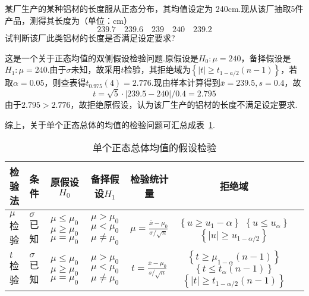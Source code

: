 \begin{example}\label{exam7.2.2}
	某厂生产的某种铝材的长度服从正态分布，其均值设定为 240cm.现从该厂抽取5件产品，测得其长度为（单位：cm）
	\[239.7 \quad 239.6 \quad 239 \quad 240 \quad 239.2\]
	试判断该厂此类铝材的长度是否满足设定要求?
	
	这是一个关于正态均值的双侧假设检验问题.原假设是$H_{0}:\mu =240$，备择假设是$H_{1}:\mu =240$.由于$\sigma$未知，故采用$t$检验，其拒绝域为$\left\{\left| t\right|\geq t_{1-a/2}\left(n-1\right)\right\}$，若取$\alpha=0.05$，则查表得$t_{0.975}(4)=2.776$.现由样本计算得到$\overline{ x }=239.5,s=0.4$，故
	\[t = \sqrt { 5 } \cdot | 239.5 - 240 | / 0.4 = 2.795\]
	由于$2.795>2.776$，故拒绝原假设，认为该厂生产的铝材的长度不满足设定要求.
	
	综上，关于单个正态总体的均值的检验问题可汇总成表~\ref{tab7.2.1}.
	\begin{table}[!ht]
		\centering
		\caption{单个正态总体均值的假设检验}\label{tab7.2.1}
\begin{tabularx}{\textwidth}{p{1.5cm}p{1.5cm}ccccc}
			\toprule
检验法&条件&原假设$H_{0}$&备择假设$H_{1}$&检验统计量&拒绝域\\
			\midrule
$\mu $检验&$\sigma$已知&\parbox{1.5cm}{$\mu \leq \mu _ { 0 }$\\$\mu \geq \mu _ { 0 }$\\$\mu = \mu _ { 0 }$}&\parbox{1.2cm}{$\mu > \mu _ { 0 }$\\$\mu < \mu _ { 0 }$\\$\mu \ne  \mu _ { 0 }$}&$\mu = \frac { \overline { x } - \mu _ { 0 } } { \sigma / \sqrt { n } }$&\parbox{1.2cm}{$\left\lbrace  u \geq u _ { 1 } - \alpha \right\rbrace $\\$\left\lbrace  u \leq u _ {\alpha} \right\rbrace $\\$\left\lbrace  |u| \geq u _ { 1- \alpha/ 2} \right\rbrace $}\\
$t $检验&$\sigma$已知&\parbox{1.5cm}{$\mu \leq \mu _ { 0 }$\\$\mu \geq \mu _ { 0 }$\\$\mu = \mu _ { 0 }$}&\parbox{1.2cm}{$\mu > \mu _ { 0 }$\\$\mu < \mu _ { 0 }$\\$\mu \ne  \mu _ { 0 }$}&$t = \frac { \overline { x } - \mu _ { 0 } } { s / \sqrt { n } }$&\parbox{1.2cm}{$\left\{t\geq\mu_{1-\alpha}\left(n-1\right)\right\} $\\$\left\{ t\leq t_{\alpha}\left(n-1\right)\right\} $\\$\left\{\left| t\right|\geq t_{1-\alpha/2}\left(n-1\right)\right\} $}\\
			\bottomrule
		\end{tabularx}
	\end{table}
\end{example}

